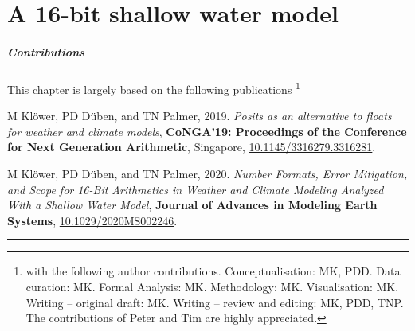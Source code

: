 \chapter{A 16-bit shallow water model}
\label{chap:shallow_water}

\small \paragraph{Contributions} This chapter is largely based on the following publications \footnote{with the following author contributions.
Conceptualisation: MK, PDD. Data curation: MK. Formal Analysis: MK. Methodology: MK. Visualisation: MK. Writing – original draft:
MK. Writing – review and editing: MK, PDD, TNP. The contributions of Peter and Tim are highly appreciated.}

\vspace{\baselineskip}
\indent M Klöwer, PD Düben, and TN Palmer, 2019. \emph{Posits as an alternative to floats for weather and climate models},
\textbf{CoNGA'19: Proceedings of the Conference for Next Generation Arithmetic}, Singapore,
\href{https://doi.org/10.1145/3316279.3316281}{10.1145/3316279.3316281}.

\indent M Klöwer, PD Düben, and TN Palmer, 2020. \emph{Number Formats, Error Mitigation, and Scope for 16-Bit Arithmetics
in Weather and Climate Modeling Analyzed With a Shallow Water Model}, \textbf{Journal of Advances in Modeling Earth Systems},
\href{https://doi.org/10.1029/2020MS002246}{10.1029/2020MS002246}.
\vspace{\baselineskip}
\hrule
\vspace{\baselineskip}
\normalsize

